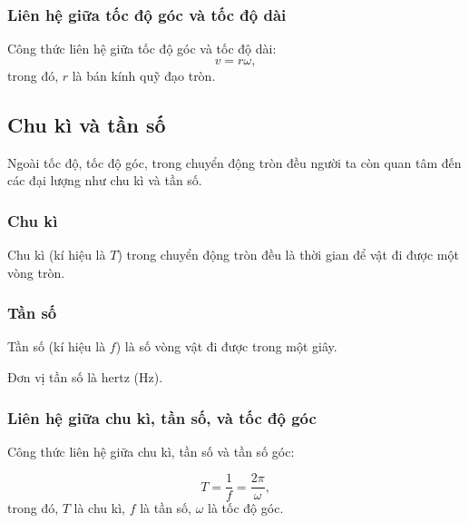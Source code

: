 \subsubsection{Liên hệ giữa tốc độ góc và tốc độ dài}
Công thức liên hệ giữa tốc độ góc và tốc độ dài:
$$v=r\omega,$$ 
trong đó, $r$ là bán kính quỹ đạo tròn.		


\subsection{Chu kì và tần số}
Ngoài tốc độ, tốc độ góc, trong chuyển động tròn đều người ta còn quan tâm đến các đại lượng như chu kì và tần số.

\subsubsection{Chu kì}

Chu kì (kí hiệu là $T$) trong chuyển động tròn đều là thời gian để vật đi được một vòng tròn.

\subsubsection{Tần số}
Tần số (kí hiệu là $f$) là số vòng vật đi được trong một giây.

Đơn vị tần số là hertz (Hz).

\subsubsection{Liên hệ giữa chu kì, tần số, và tốc độ góc}

Công thức liên hệ giữa chu kì, tần số và tần số góc:

$$T=\dfrac{1}{f}=\dfrac{2\pi}{\omega},$$
trong đó, $T$ là chu kì, $f$ là tần số, $\omega$ là tốc độ góc. 				


